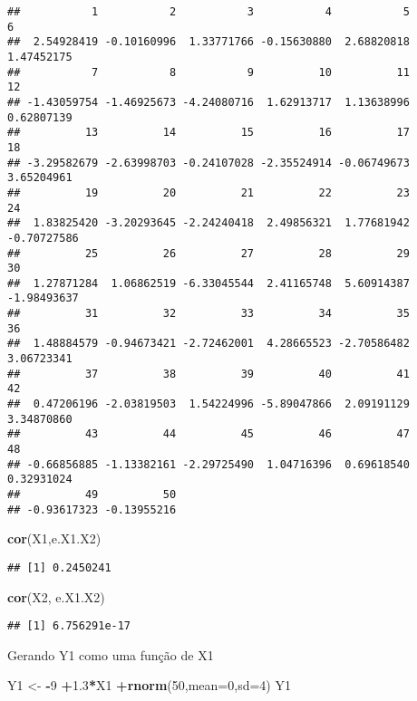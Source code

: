 \documentclass[]{article}
\newenvironment{Shaded}{\begin{snugshade}}{\end{snugshade}}
\newcommand{\KeywordTok}[1]{\textcolor[rgb]{0.13,0.29,0.53}{\textbf{#1}}}
\newcommand{\DataTypeTok}[1]{\textcolor[rgb]{0.13,0.29,0.53}{#1}}
\newcommand{\DecValTok}[1]{\textcolor[rgb]{0.00,0.00,0.81}{#1}}
\newcommand{\FloatTok}[1]{\textcolor[rgb]{0.00,0.00,0.81}{#1}}
\newcommand{\StringTok}[1]{\textcolor[rgb]{0.31,0.60,0.02}{#1}}
\newcommand{\OperatorTok}[1]{\textcolor[rgb]{0.81,0.36,0.00}{\textbf{#1}}}
\newcommand{\NormalTok}[1]{#1}
\begin{document}
\begin{verbatim}
##           1           2           3           4           5           6 
##  2.54928419 -0.10160996  1.33771766 -0.15630880  2.68820818  1.47452175 
##           7           8           9          10          11          12 
## -1.43059754 -1.46925673 -4.24080716  1.62913717  1.13638996  0.62807139 
##          13          14          15          16          17          18 
## -3.29582679 -2.63998703 -0.24107028 -2.35524914 -0.06749673  3.65204961 
##          19          20          21          22          23          24 
##  1.83825420 -3.20293645 -2.24240418  2.49856321  1.77681942 -0.70727586 
##          25          26          27          28          29          30 
##  1.27871284  1.06862519 -6.33045544  2.41165748  5.60914387 -1.98493637 
##          31          32          33          34          35          36 
##  1.48884579 -0.94673421 -2.72462001  4.28665523 -2.70586482  3.06723341 
##          37          38          39          40          41          42 
##  0.47206196 -2.03819503  1.54224996 -5.89047866  2.09191129  3.34870860 
##          43          44          45          46          47          48 
## -0.66856885 -1.13382161 -2.29725490  1.04716396  0.69618540  0.32931024 
##          49          50 
## -0.93617323 -0.13955216
\end{verbatim}

\begin{Shaded}
\begin{Highlighting}[]
\KeywordTok{cor}\NormalTok{(X1,e.X1.X2)}
\end{Highlighting}
\end{Shaded}

\begin{verbatim}
## [1] 0.2450241
\end{verbatim}

\begin{Shaded}
\begin{Highlighting}[]
\KeywordTok{cor}\NormalTok{(X2, e.X1.X2)}
\end{Highlighting}
\end{Shaded}

\begin{verbatim}
## [1] 6.756291e-17
\end{verbatim}

Gerando Y1 como uma função de X1

\begin{Shaded}
\begin{Highlighting}[]
\NormalTok{Y1 <-}\StringTok{ }\OperatorTok{-}\DecValTok{9} \OperatorTok{+}\FloatTok{1.3}\OperatorTok{*}\NormalTok{X1 }\OperatorTok{+}\KeywordTok{rnorm}\NormalTok{(}\DecValTok{50}\NormalTok{,}\DataTypeTok{mean=}\DecValTok{0}\NormalTok{,}\DataTypeTok{sd=}\DecValTok{4}\NormalTok{)}
\NormalTok{Y1}
\end{Highlighting}
\end{Shaded}
\end{document}
